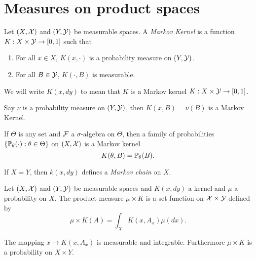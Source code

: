 \section{Measures on product spaces}
\begin{defn}
    Let $(X,{\mathcal{X}})$ and $(Y,\mathcal{Y})$ be measurable spaces. A \emph{Markov Kernel} is a function $K : X \times \mathcal{Y} \to [0,1]$ such that 
    \begin{enumerate}
        \item For all $x \in X$, $K(x,\cdot)$ is a probability measure on $(Y,\mathcal{Y})$.
        \item For all $B \in \mathcal{Y}$, $K(\cdot, B)$ is measurable.
    \end{enumerate}
    We will write $K(x,dy)$ to mean that $K$ is a Markov kernel $K:X\times \mathcal{Y} \to [0,1]$.
\end{defn}
\begin{ex}
    Say $\nu$ is a probability measure on $(Y,\mathcal{Y})$, then $K(x,B) = \nu(B)$ is a Markov Kernel.
\end{ex}
\begin{ex}
    If $\Theta$ is any set and ${\mathcal{F}}$ a $\sigma$-algebra on $\Theta$, then a family of probabilities $\{{\mathbb{P}}_\theta(\cdot):\theta \in \Theta\}$  on $(X,{\mathcal{X}})$ is a Markov kernel
    \[K(\theta,B) = {\mathbb{P}}_\theta(B). \]
\end{ex}
\begin{ex}
    If $X=Y$, then $k(x,dy)$ defines a \emph{Markov chain} on $X$.
\end{ex}
\begin{defn}
    Let $(X,{\mathcal{X}})$ and $(Y,\mathcal{Y})$ be measurable spaces and $K(x,dy)$ a kernel and $\mu$ a probability on $X$. The product measure $\mu \times K$  is a set function on ${\mathcal{X}} \times \mathcal{Y}$ defined by 
    \[\mu\times K (A) = \int_X K(x,A_x)\mu(dx). \]
\end{defn}
\begin{prop}
    The mapping $x \mapsto K(x,A_x)$ is measurable and integrable. Furthermore $\mu \times K$ is a probability on $X \times Y$.
\end{prop}
